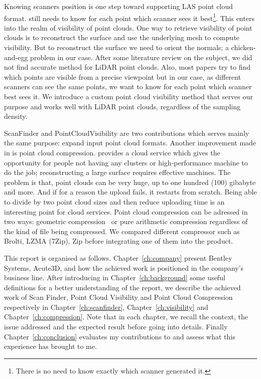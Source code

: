 Knowing scanners position is one step toward supporting LAS point cloud format. \CC still needs to know for each point which scanner sees it best\footnote{There is no need to know exactly which scanner generated it.}. This enters into the realm of visibility of point clouds. One way to retrieve visibility of point clouds is to reconstruct the surface and use the underlying mesh to compute visibility. But to reconstruct the surface we need to orient the normals; a chicken-and-egg problem in our case. After some literature review on the subject, we did not find accurate method for LiDAR point clouds. Also, most papers try to find which points are visible from a precise viewpoint but in our case, as different scanners can see the same points, we want to know for each point which scanner best sees it. We introduce a custom point cloud visibility method that serves our purpose and works well with LiDAR point clouds, regardless of the sampling density.

ScanFinder and PointCloudVisibility are two contributions which serves mainly the same purpose: expand \CC input point cloud formats. Another improvement made in \CC is point cloud compression. \CC provides a cloud service which gives the opportunity for people not having any clusters or high-performance machine to do the job; reconstructing a large surface requires effective machines. The problem is that, point clouds can be very huge, up to one hundred (100) gibabyte and more. And if for a reason the upload fails, it restarts from scratch. Being able to divide by two point cloud sizes and then reduce uploading time is an interesting point for \CC cloud services. Point cloud compression can be adressed in two ways: geometric compression~\cite{compress1, compress2} or pure arithmetic compression regardless of the kind of file being compressed. We compared different compressor such as Brolti, LZMA (7Zip), Zip before integrating one of them into the product.

This report is organised as follows. Chapter~\ref{ch:company} present Bentley Systems, Acute3D, \CC and how the achieved work is positioned in the company's business line. After introducing in Chapter~\ref{ch:background} some useful definitions for a better understanding of the report, we describe the achieved work of Scan Finder, Point Cloud Visibility and Point Cloud Compression respectively in Chapter~\ref{ch:scanfinder}, Chapter~\ref{ch:visibility} and
Chapter~\ref{ch:compression}. Note that in each chapter, we recall the context, the issue addressed and the expected result before going into details. Finally Chapter~\ref{ch:conclusion} evaluates my contributions to \CC and assess what this experience has brought to me.

